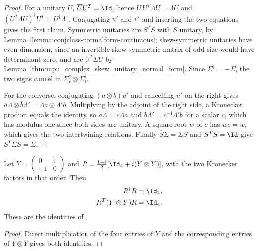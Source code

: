 \begin{proof}
    \leanok
    For a unitary $U$, $\overline UU^T=\Id$, hence
    $\overline U\,U^T\Lambda U=\Lambda U$ and
    $(U^T\Lambda U)^\dagger U^T=U^\dagger\Lambda^\dagger$. Conjugating $u'$
    and $v'$ and inserting the two equations gives the first claim. Symmetric
    unitaries are $S^TS$ with $S$ unitary, by
    Lemma~\ref{lemma:conjclass-normalform-continuous}; skew-symmetric
    unitaries have even dimension, since an invertible skew-symmetric matrix
    of odd size would have determinant zero, and are $U^T\Sigma U$ by
    Lemma~\ref{thm:mpu_complex_skew_unitary_normal_form}. Since
    $\Sigma^\dagger=-\Sigma$, the two signs cancel in
    $\Sigma_r^\dagger\otimes\Sigma_\ell^\dagger$.

    For the converse, conjugating $(a\otimes b)u'$ and cancelling $u'$ on the
    right gives
    $\overline a\Lambda\otimes\overline b\Lambda'=\Lambda a\otimes\Lambda' b$.
    Multiplying by the adjoint of the right side, a Kronecker product equals
    the identity, so $\overline a\Lambda=c\Lambda a$ and
    $\overline b\Lambda'=c^{-1}\Lambda'b$ for a scalar $c$, which has modulus
    one since both sides are unitary. A square root $w$ of $c$ has
    $\overline wc=w$, which gives the two intertwining relations. Finally
    $\overline S\Sigma=\Sigma S$ and $S^T\overline S=\Id$ give
    $S^T\Sigma S=\Sigma$.
\end{proof}

\begin{lemma}
    \label{lem:mpu_symplectic_four_congruence}
    \leanok
    Let $Y=\begin{pmatrix}0&1\\-1&0\end{pmatrix}$ and
    $R=\frac{1-i}{2}[\Id_4+i(Y\otimes Y)]$, with the two Kronecker factors in
    that order. Then
    \begin{align}
        R^\dagger R      & =\Id_4, \\
        R^T(Y\otimes Y)R & =\Id_4.
    \end{align}
    These are the identities of \cite[lines~1165--1185]{Cirac2017MPU}.
\end{lemma}

\begin{proof}
    \leanok
    Direct multiplication of the four entries of $Y$ and the corresponding
    entries of $Y\otimes Y$ gives both identities.
\end{proof}

